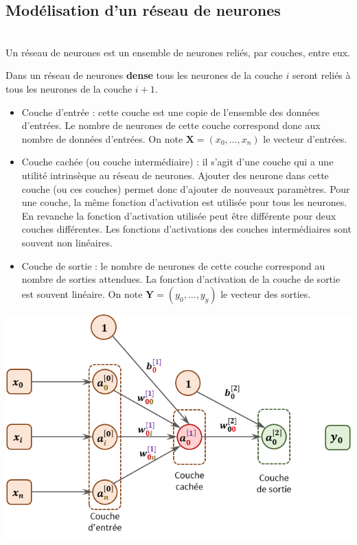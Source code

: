 \subsection{Modélisation d'un réseau de neurones} 

\begin{defi}[Couches] ~\\

Un réseau de neurones est un ensemble de neurones reliés, par couches, entre eux. 

Dans un réseau de neurones \textbf{dense} tous les neurones de la couche $i$ seront reliés à tous les neurones de la couche $i+1$.

\begin{itemize}
\item Couche d'entrée : cette couche est une copie de l'ensemble des données d'entrées. Le nombre de neurones de cette couche correspond donc aux nombre de données d'entrées. On note $\mathbf{X} = \left( x_0, ..., x_n\right)$ le vecteur d'entrées.
\item Couche cachée (ou couche intermédiaire) : il s'agit d'une couche qui a une utilité intrinsèque au réseau de neurones. Ajouter des neurone dans cette couche (ou ces couches) permet donc d'ajouter de nouveaux paramètres.  Pour une couche, la même fonction d'activation est utilisée pour tous les neurones. En revanche la fonction d'activation utilisée peut être différente pour deux couches différentes. Les fonctions d'activations des couches intermédiaires sont souvent non linéaires.
\item Couche de sortie : le nombre de neurones de cette couche correspond au nombre de sorties attendues. La fonction d'activation de la couche de sortie est souvent linéaire. On note $\mathbf{Y} = \left( y_0, ..., y_y\right)$ le vecteur des sorties.
\end{itemize}
\begin{center}
\includegraphics[width=.8\linewidth]{images/fig_04}
\end{center}


\end{defi}
